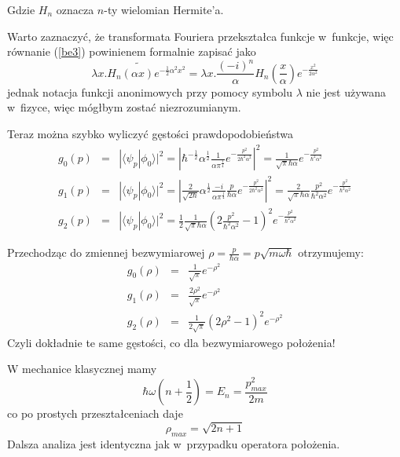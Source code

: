 \documentclass{article}
\begin{document}
Gdzie $H_n$ oznacza $n$-ty wielomian Hermite'a.

Warto zaznaczyć, że transformata Fouriera przekształca funkcje w~funkcje, więc równanie (\ref{be3})
powinienem formalnie zapisać jako
\[
\widetilde{\lambda{}x.H_n(\alpha{}x)e^{-\frac{1}{2}\alpha^2{}x^2}} = 
	\lambda{}x.\frac{(-i)^n}{\alpha}H_n\left(\frac{x}{\alpha}\right)e^{-\frac{x^2}{2\alpha^2}}
\]
jednak notacja funkcji anonimowych przy pomocy symbolu $\lambda$ nie jest używana w~fizyce,
więc mógłbym zostać niezrozumianym.

Teraz można szybko wyliczyć gęstości prawdopodobieństwa
\begin{eqnarray*}
g_0(p) &=& |\langle\psi_p|\phi_0\rangle|^2 = 
	\left|\hbar^{-\frac{1}{2}}\alpha^{\frac{1}{2}}\frac{1}{\alpha\pi^\frac{1}{4}}
	e^{-\frac{p^2}{2\hbar^2\alpha^2}}\right|^2 =
	\frac{1}{\sqrt{\pi}\hbar\alpha}e^{-\frac{p^2}{\hbar^2\alpha^2}} \\
g_1(p) &=& |\langle\psi_p|\phi_0\rangle|^2 = 
	\left|\frac{2}{\sqrt{2\hbar}}\alpha^{\frac{1}{2}}\frac{-i}{\alpha\pi^\frac{1}{4}}
	\frac{p}{\hbar\alpha}e^{-\frac{p^2}{2\hbar^2\alpha^2}}\right|^2 =
	\frac{2}{\sqrt{\pi}\hbar\alpha}\frac{p^2}{\hbar^2\alpha^2}e^{-\frac{p^2}{\hbar^2\alpha^2}} \\
g_2(p) &=& |\langle\psi_p|\phi_0\rangle|^2 =
	\frac{1}{2}\frac{1}{\sqrt{\pi}\hbar\alpha}
	\left(2\frac{p^2}{\hbar^2\alpha^2} - 1\right)^2e^{-\frac{p^2}{\hbar^2\alpha^2}}
\end{eqnarray*}

Przechodząc do zmiennej bezwymiarowej $\rho=\frac{p}{\hbar\alpha}=p\sqrt{m\omega\hbar}$ otrzymujemy:
\begin{eqnarray*}
g_0(\rho) & = & \frac{1}{\sqrt{\pi}}e^{-\rho^2} \\
g_1(\rho) & = & \frac{2\rho^2}{\sqrt{\pi}}e^{-\rho^2} \\
g_2(\rho) & = & \frac{1}{2\sqrt{\pi}}\left(2\rho^2 - 1\right)^2e^{-\rho^2}
\end{eqnarray*}
Czyli dokładnie te same gęstości, co dla bezwymiarowego położenia!

W mechanice klasycznej mamy
\[
\hbar\omega(n+\frac{1}{2}) = E_n = \frac{p_{max}^2}{2m}
\]
co po prostych przeształceniach daje
\[
\rho_{max}=\sqrt{2n+1}
\]
Dalsza analiza jest identyczna jak w~przypadku operatora położenia.
\end{document}
